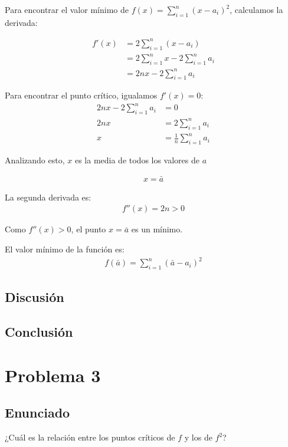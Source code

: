 \documentclass{article}
\begin{document}
Para encontrar el valor mínimo de $f(x) = \sum_{i=1}^{n} (x - a_i)^2$, calculamos la derivada:

\begin{align}
    f'(x) &= 2\sum_{i=1}^{n} (x - a_i) \\
    &= 2\sum_{i=1}^{n} x - 2\sum_{i=1}^{n} a_i \\
    &= 2nx - 2\sum_{i=1}^{n} a_i
\end{align}

Para encontrar el punto crítico, igualamos $f'(x) = 0$:
\begin{align}
    2nx - 2\sum_{i=1}^{n} a_i &= 0 \\
    2nx &= 2\sum_{i=1}^{n} a_i \\
    x &= \frac{1}{n}\sum_{i=1}^{n} a_i 
\end{align}

Analizando esto, $x$ es la media de todos los valores de $a$

\begin{align}
    x = \bar{a}
\end{align}

La segunda derivada es:
\begin{align}
f''(x) = 2n > 0
\end{align}

Como $f''(x) > 0$, el punto $x = \bar{a}$ es un mínimo.

El valor mínimo de la función es:
\begin{align}
f(\bar{a}) = \sum_{i=1}^{n} (\bar{a} - a_i)^2
\end{align}

\subsection{Discusión}

\subsection{Conclusión}

\section{Problema 3}

\subsection{Enunciado}
¿Cuál es la relación entre los puntos críticos de $f$ y los de $f^{2}$?
\end{document}
